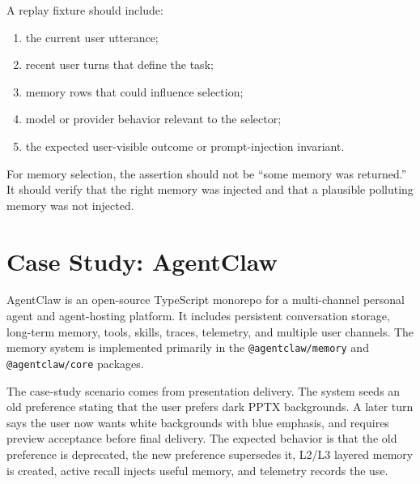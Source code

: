 \documentclass[11pt]{article}
\begin{document}
A replay fixture should include:
\begin{enumerate}[leftmargin=*]
  \item the current user utterance;
  \item recent user turns that define the task;
  \item memory rows that could influence selection;
  \item model or provider behavior relevant to the selector;
  \item the expected user-visible outcome or prompt-injection invariant.
\end{enumerate}

For memory selection, the assertion should not be ``some memory was returned.''
It should verify that the right memory was injected and that a plausible
polluting memory was not injected.

\section{Case Study: AgentClaw}

AgentClaw is an open-source TypeScript monorepo for a multi-channel personal
agent and agent-hosting platform. It includes persistent conversation storage,
long-term memory, tools, skills, traces, telemetry, and multiple user channels.
The memory system is implemented primarily in the \texttt{@agentclaw/memory} and
\texttt{@agentclaw/core} packages.

The case-study scenario comes from presentation delivery. The system seeds an old
preference stating that the user prefers dark PPTX backgrounds. A later turn says
the user now wants white backgrounds with blue emphasis, and requires preview
acceptance before final delivery. The expected behavior is that the old
preference is deprecated, the new preference supersedes it, L2/L3 layered memory
is created, active recall injects useful memory, and telemetry records the use.
\end{document}
